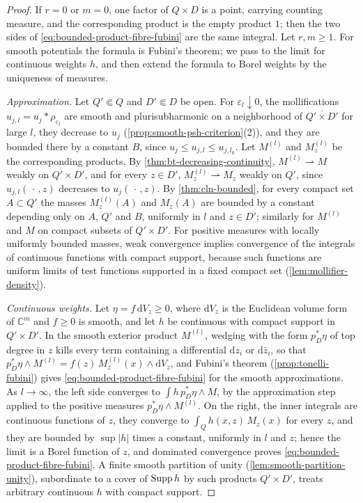 \begin{proof}
If $r=0$ or $m=0$, one factor of $Q\times D$ is a point, carrying counting measure, and the corresponding product is the empty product $1$; then the two sides of \eqref{eq:bounded-product-fibre-fubini} are the same integral. Let $r,m\geq1$. For smooth potentials the formula is Fubini's theorem; we pass to the limit for continuous weights $h$, and then extend the formula to Borel weights by the uniqueness of measures.

\emph{Approximation.} Let $Q'\Subset Q$ and $D'\Subset D$ be open. For $\varepsilon_l\downarrow0$, the mollifications $u_{j,l}=u_j*\rho_{\varepsilon_l}$ are smooth and plurisubharmonic on a neighborhood of $\overline{Q'\times D'}$ for large $l$, they decrease to $u_j$ (\cref{prop:smooth-psh-criterion}(2)), and they are bounded there by a constant $B$, since $u_j\leq u_{j,l}\leq u_{j,l_0}$. Let $M^{(l)}$ and $M_z^{(l)}$ be the corresponding products. By \cref{thm:bt-decreasing-continuity}, $M^{(l)}\rightharpoonup M$ weakly on $Q'\times D'$, and for every $z\in D'$, $M_z^{(l)}\rightharpoonup M_z$ weakly on $Q'$, since $u_{j,l}(\,\cdot\,,z)$ decreases to $u_j(\,\cdot\,,z)$. By \cref{thm:cln-bounded}, for every compact set $A\subset Q'$ the masses $M_z^{(l)}(A)$ and $M_z(A)$ are bounded by a constant depending only on $A$, $Q'$ and $B$, uniformly in $l$ and $z\in D'$; similarly for $M^{(l)}$ and $M$ on compact subsets of $Q'\times D'$. For positive measures with locally uniformly bounded masses, weak convergence implies convergence of the integrals of continuous functions with compact support, because such functions are uniform limits of test functions supported in a fixed compact set (\cref{lem:mollifier-density}).

\emph{Continuous weights.} Let $\eta=f\,\mathrm dV_z\geq0$, where $\mathrm dV_z$ is the Euclidean volume form of $\mathbb C^m$ and $f\geq0$ is smooth, and let $h$ be continuous with compact support in $Q'\times D'$. In the smooth exterior product $M^{(l)}$, wedging with the form $p_D^*\eta$ of top degree in $z$ kills every term containing a differential $\mathrm dz_i$ or $\mathrm d\bar z_i$, so that $p_D^*\eta\wedge M^{(l)}=f(z)\,M_z^{(l)}(x)\wedge\mathrm dV_z$, and Fubini's theorem (\cref{prop:tonelli-fubini}) gives \eqref{eq:bounded-product-fibre-fubini} for the smooth approximations. As $l\to\infty$, the left side converges to $\int h\,p_D^*\eta\wedge M$, by the approximation step applied to the positive measures $p_D^*\eta\wedge M^{(l)}$. On the right, the inner integrals are continuous functions of $z$, they converge to $\int_Qh(x,z)\,M_z(x)$ for every $z$, and they are bounded by $\sup|h|$ times a constant, uniformly in $l$ and $z$; hence the limit is a Borel function of $z$, and dominated convergence proves \eqref{eq:bounded-product-fibre-fubini}. A finite smooth partition of unity (\cref{lem:smooth-partition-unity}), subordinate to a cover of $\operatorname{Supp} h$ by such products $Q'\times D'$, treats arbitrary continuous $h$ with compact support.


\end{proof}
